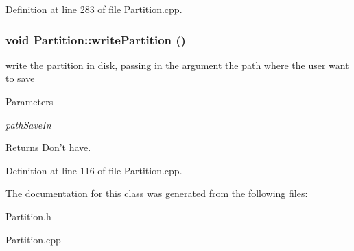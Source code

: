 Definition at line 283 of file Partition.cpp.\hypertarget{classPartition_a4204d0b43248fb2635607b8f87caff69}{
\subsubsection[{writePartition}]{\setlength{\rightskip}{0pt plus 5cm}void Partition::writePartition ()}}
\label{classPartition_a4204d0b43248fb2635607b8f87caff69}
write the partition in disk, passing in the argument the path where the user want to save 
\begin{DoxyParams}{Parameters}
\item[{\em pathSaveIn}]\end{DoxyParams}
\begin{DoxyReturn}{Returns}
Don't have. 
\end{DoxyReturn}


Definition at line 116 of file Partition.cpp.

The documentation for this class was generated from the following files:\begin{DoxyCompactItemize}
\item 
Partition.h\item 
Partition.cpp\end{DoxyCompactItemize}
